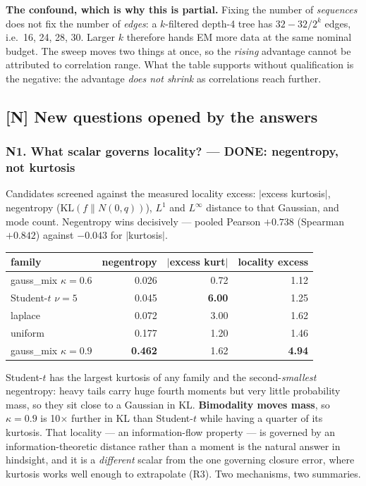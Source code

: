 \documentclass[11pt,a4paper]{article}
\newcommand{\done}{\textcolor{GoodGreen}{\textbf{DONE}}}
\begin{document}
\noindent
\textbf{The confound, which is why this is partial.} Fixing the number of \emph{sequences}
does not fix the number of \emph{edges}: a $k$-filtered depth-4 tree has $32 - 32/2^k$ edges,
i.e.\ 16, 24, 28, 30. Larger $k$ therefore hands EM more data at the same nominal budget.
The sweep moves two things at once, so the \emph{rising} advantage cannot be attributed to
correlation range. What the table supports without qualification is the negative: the
advantage \emph{does not shrink} as correlations reach further.

\subsection{[N] New questions opened by the answers}

\subsubsection*{N1. What scalar governs locality? --- \done: negentropy, not kurtosis}

\begin{sloppypar}
Candidates screened against the measured locality excess: $|$excess kurtosis$|$, negentropy
($\mathrm{KL}(f\|N(0,q))$), $L^1$ and $L^\infty$ distance to that Gaussian, and mode count.
Negentropy wins decisively --- pooled Pearson $\mathbf{+0.738}$ (Spearman $+0.842$) against
$-0.043$ for $|$kurtosis$|$.
\end{sloppypar}

\begin{center}
\begin{tabular}{@{}lrrr@{}}
\toprule
family & negentropy & $|$excess kurt$|$ & locality excess \\
\midrule
gauss\_mix $\kappa=0.6$ & 0.026 & 0.72 & 1.12 \\
Student-$t$ $\nu=5$ & 0.045 & \textbf{6.00} & 1.25 \\
laplace & 0.072 & 3.00 & 1.62 \\
uniform & 0.177 & 1.20 & 1.46 \\
gauss\_mix $\kappa=0.9$ & \textbf{0.462} & 1.62 & \textbf{4.94} \\
\bottomrule
\end{tabular}
\end{center}

\noindent
Student-$t$ has the largest kurtosis of any family and the second-\emph{smallest} negentropy:
heavy tails carry huge fourth moments but very little probability mass, so they sit close to
a Gaussian in KL. \textbf{Bimodality moves mass}, so $\kappa=0.9$ is 10$\times$ further in KL
than Student-$t$ while having a quarter of its kurtosis. That locality --- an information-flow
property --- is governed by an information-theoretic distance rather than a moment is the
natural answer in hindsight, and it is a \emph{different} scalar from the one governing
closure error, where kurtosis works well enough to extrapolate (R3). Two mechanisms, two
summaries.
\end{document}
